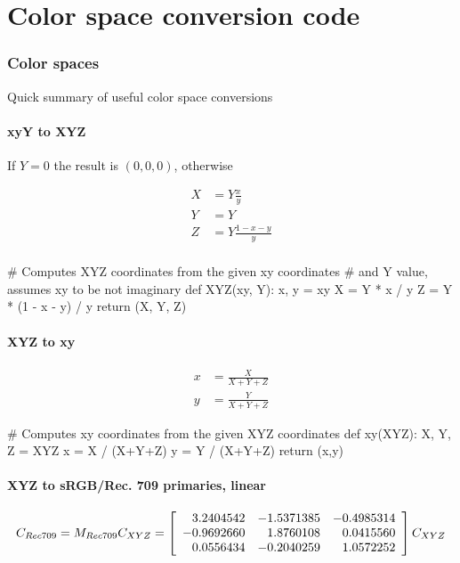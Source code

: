 \section{Color space conversion code}

\subsubsection{Color spaces}

Quick summary of useful color space conversions

\paragraph{xyY to XYZ}

If $Y = 0$ the result is $(0,0,0)$, otherwise

\begin{align*}
X &= Y \frac{x}{y} \\
Y &= Y \\
Z &= Y \frac{1-x-y}{y} \\
\end{align*}


\begin{pythoncode}
# Computes XYZ coordinates from the given xy coordinates
# and Y value, assumes xy to be not imaginary
def XYZ(xy, Y):
    x, y = xy
    X = Y * x / y
    Z = Y * (1 - x - y) / y
    return (X, Y, Z)
\end{pythoncode}


\paragraph{XYZ to xy}

\begin{align*}
x &= \frac {X}{X+Y+Z} \\
y &= \frac {Y}{X+Y+Z}
\end{align*}


\begin{pythoncode}
# Computes xy coordinates from the given XYZ coordinates
def xy(XYZ):
    X, Y, Z = XYZ
    x = X / (X+Y+Z)
    y = Y / (X+Y+Z)
    return (x,y)
\end{pythoncode}


\paragraph{XYZ to sRGB/Rec. 709 primaries, linear}

\begin{displaymath}
C_{Rec709} = M_{Rec709} C_{XYZ} = \left[\begin{array}{r@{.}lr@{.}lr@{.}l}
 3&2404542 & -1&5371385 & -0&4985314 \\
-0&9692660 &  1&8760108 &  0&0415560 \\
 0&0556434 & -0&2040259 &  1&0572252 \\
\end{array}\right] C_{XYZ}
\end{displaymath}

